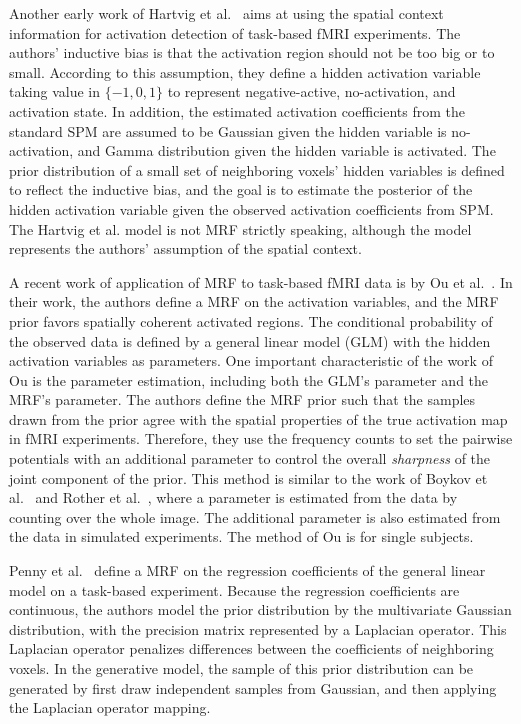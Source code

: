 Another early work of Hartvig et al.~\cite{hartvig2000spatial} aims at using the
spatial context information for activation detection of task-based fMRI
experiments. The authors' inductive bias is that the activation region should
not be too big or to small. According to this assumption, they define a hidden
activation variable taking value in $\{-1, 0, 1\}$ to represent negative-active,
no-activation, and activation state. In addition, the estimated activation
coefficients from the standard SPM are assumed to be Gaussian given the hidden
variable is no-activation, and Gamma distribution given the hidden variable is
activated. The prior distribution of a small set of neighboring voxels' hidden
variables is defined to reflect the inductive bias, and the goal is to estimate
the posterior of the hidden activation variable given the observed activation
coefficients from SPM. The Hartvig et al. model is not MRF strictly speaking,
although the model represents the authors' assumption of the spatial context.

A recent work of application of MRF to task-based fMRI data is by Ou et
al.~\cite{ou2010combining}. In their work, the authors define a MRF on the
activation variables, and the MRF prior favors spatially coherent activated
regions. The conditional probability of the observed data is defined by a
general linear model (GLM) with the hidden activation variables as
parameters. One important characteristic of the work of Ou is the parameter
estimation, including both the GLM's parameter and the MRF's parameter. The
authors define the MRF prior such that the samples drawn from the prior agree
with the spatial properties of the true activation map in fMRI
experiments. Therefore, they use the frequency counts to set the pairwise
potentials with an additional parameter to control the overall
\emph{sharpness} of the joint component of the prior. This method is similar
to the work of Boykov et al.~\cite{boykov2001interactive} and Rother et
al.~\cite{rother2004grabcut}, where a parameter is estimated from the data by
counting over the whole image. The additional parameter is also estimated from
the data in simulated experiments. The method of Ou is for single
subjects.

Penny et al.~\cite{penny2005bayesian} define a MRF on the regression
coefficients of the general linear model on a task-based experiment. Because the
regression coefficients are continuous, the authors model the prior distribution
by the multivariate Gaussian distribution, with the precision matrix represented by
a Laplacian operator. This Laplacian operator penalizes differences between
the coefficients of neighboring voxels. In the generative model, the sample of this
prior distribution can be generated by first draw independent samples from
Gaussian, and then applying the Laplacian operator mapping.

